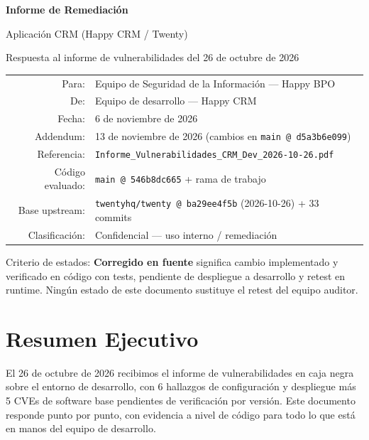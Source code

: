 \documentclass[11pt,a4paper]{article}
\begin{document}
\begin{titlepage}
\centering
\vspace*{2cm}
{\LARGE\bfseries Informe de Remediación\par}
\vspace{0.4cm}
{\Large Aplicación CRM (Happy CRM / Twenty)\par}
\vspace{0.6cm}
{\large Respuesta al informe de vulnerabilidades del 26 de octubre de 2026\par}
\vspace{1.2cm}
\begin{tabular}{rl}
\toprule
Para: & Equipo de Seguridad de la Información --- Happy BPO \\
De: & Equipo de desarrollo --- Happy CRM \\
Fecha: & 6 de noviembre de 2026 \\
Addendum: & 13 de noviembre de 2026 (cambios en \texttt{main @ d5a3b6e099}) \\
Referencia: & \texttt{Informe\_Vulnerabilidades\_CRM\_Dev\_2026-10-26.pdf} \\
Código evaluado: & \texttt{main @ 546b8dc665} + rama de trabajo \\
Base upstream: & \texttt{twentyhq/twenty @ ba29ee4f5b} (2026-10-26) + 33 commits \\
Clasificación: & Confidencial --- uso interno / remediación \\
\bottomrule
\end{tabular}
\vfill
{\small Criterio de estados: \textbf{Corregido en fuente} significa cambio implementado y
verificado en código con tests, pendiente de despliegue a desarrollo y retest en runtime.
Ningún estado de este documento sustituye el retest del equipo auditor.\par}
\end{titlepage}

\tableofcontents
\newpage

\section{Resumen Ejecutivo}

El 26 de octubre de 2026 recibimos el informe de vulnerabilidades en caja negra sobre el
entorno de desarrollo, con 6 hallazgos de configuración y despliegue más 5 CVEs de
software base pendientes de verificación por versión. Este documento responde punto por
punto, con evidencia a nivel de código para todo lo que está en manos del equipo de
desarrollo.
\end{document}
